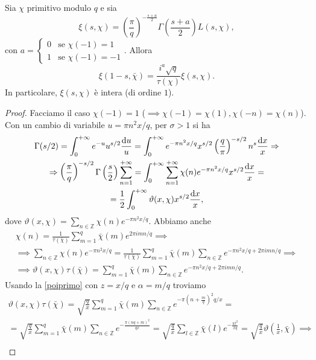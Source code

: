 \begin{prop}
  Sia $\chi$ primitivo modulo $q$ e sia
  $$\xi(s,\chi)=\left(\frac{\pi}{q}\right)^{-\frac{s+a}{2}}\Gamma\left(\frac{s+a}{2}\right)L(s,\chi),$$
  con $a=\begin{cases}
    0 &\mbox{se }\chi(-1)=1 \\
    1 &\mbox{se }\chi(-1)=-1
\end{cases}.$ Allora
\begin{equation} \label{funelle}
  \xi(1-s,\bar{\chi})=\frac{i^a\sqrt{q}}{\tau(\chi)}\xi(s,\chi).
\end{equation}
In particolare, $\xi(s,\chi)$ è intera (di ordine $1$).
\end{prop}

\begin{proof}
  Facciamo il caso $\chi(-1)=1$ ($\implies \chi(-1)=\chi(1), \chi(-n)=\chi(n)$). Con un cambio di variabile $u=\pi n^2x/q$, per $\sigma>1$ si ha
  \begin{gather*}
    \Gamma(s/2)=\int_0^{+\infty} e^{-u}u^{s/2}\frac{\mathop{}\!\mathrm{d} u}{u}=\int_0^{+\infty} e^{-\pi n^2x/q}x^{s/2}\left(\frac{q}{\pi}\right)^{-s/2}n^s\frac{\mathop{}\!\mathrm{d} x}{x} \Rightarrow \\
    \Rightarrow \left(\frac{\pi}{q}\right)^{-s/2}\Gamma\left(\frac{s}{2}\right)\sum_{n=1}^{+\infty}=\int_0^{+\infty} \sum_{n=1}^{+\infty} \chi(n)e^{-\pi n^2x/q}x^{s/2}\frac{\mathop{}\!\mathrm{d} x}{x}= \\
    =\frac{1}{2}\int_0^{+\infty} \vartheta(x,\chi)x^{s/2}\frac{\mathop{}\!\mathrm{d} x}{x},
  \end{gather*}
  dove $\displaystyle \vartheta(x,\chi)=\sum_{n \in \mathbb{Z}} \chi(n)e^{-\pi n^2x/q}$. Abbiamo anche
  \begin{gather*}
    \chi(n)=\frac{1}{\tau(\bar{\chi})}\sum_{m=1}^q \bar{\chi}(m)e^{2\pi imn/q} \implies \\
    \implies \sum_{n \in \mathbb{Z}} \chi(n)e^{-\pi n^2 x/q}=\frac{1}{\tau(\bar{\chi})} \sum_{m=1}^q \bar{\chi}(m) \sum_{n \in \mathbb{Z}} e^{-\pi n^2x/q+2\pi imn/q} \implies \\
    \implies \vartheta(x,\chi)\tau(\bar{\chi})=\sum_{m=1}^q \bar{\chi}(m) \sum_{n \in \mathbb{Z}} e^{-\pi n^2x/q+2\pi imn/q}.
  \end{gather*}
  Usando la \eqref{poiprimo} con $z=x/q$ e $\alpha=m/q$ troviamo
  \begin{gather*}
    \vartheta(x,\chi)\tau(\bar{\chi})=\sqrt{\frac{q}{x}}\sum_{m=1}^q \bar{\chi}(m) \sum_{n \in \mathbb{Z}} e^{-\pi\left(n+\frac{m}{q}\right)^2q/x}= \\
    =\sqrt{\frac{q}{x}}\sum_{m=1}^q \bar{\chi}(m) \sum_{n \in \mathbb{Z}} e^{-\frac{\pi(nq+m)^2}{qx}}=\sqrt{\frac{q}{x}} \sum_{l \in \mathbb{Z}} \bar{\chi}(l)e^{-\frac{\pi l^2}{xq}}=\sqrt{\frac{q}{x}}\vartheta\left(\frac{1}{x},\bar{\chi}\right) \implies \\

\end{gather*}
\end{proof}
